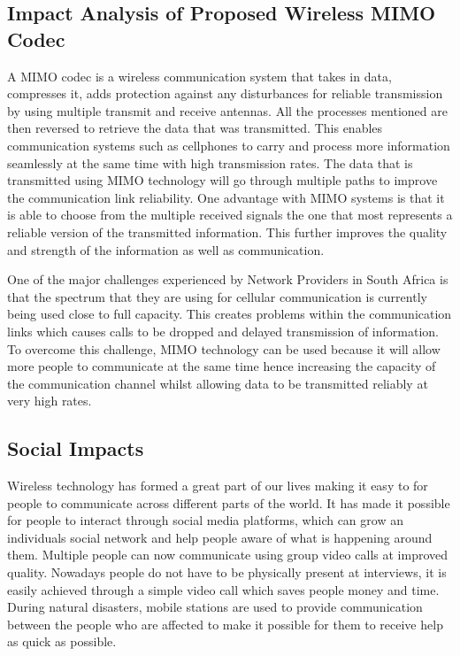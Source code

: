 \documentclass[pdftex,11pt,a4paper]{article}
\begin{document}
\newpage 
\begin{appendices}
	
	\section{Impact Analysis of Proposed Wireless MIMO Codec}
	
	A MIMO codec is a wireless communication system that takes in data, compresses it, adds protection against any disturbances for reliable transmission by using multiple transmit and receive antennas. All the processes mentioned are then reversed to retrieve the data that was transmitted. This enables communication systems such as cellphones to carry and process more information seamlessly at the same time with high transmission rates. The data that is transmitted using MIMO technology will go through multiple paths to improve the communication link reliability. One advantage with MIMO systems is that it is able to choose from the multiple received signals the one that most represents a reliable version of the transmitted information. This further improves the quality and strength of the information as well as communication.
	
	One of the major challenges experienced by Network Providers in South Africa is that the spectrum that they are using for cellular communication is currently being used close to full capacity. This creates problems within the communication links which causes calls to be dropped and delayed transmission of information. To overcome this challenge, MIMO technology can be used because it will allow more people to communicate at the same time hence increasing the capacity of the communication channel whilst allowing data to be transmitted reliably at very high rates.
	
	\subsection{Social Impacts}
	Wireless technology has formed a great part of our lives making it easy to for people to communicate across different parts of the world. It has made it possible for people to interact through social media platforms, which can grow an individuals social network and help people aware of what is happening around them. Multiple people can now communicate using group video calls at improved quality. Nowadays people do not have to be physically present at interviews, it is easily achieved through a simple video call which saves people money and time. During natural disasters, mobile stations are used to provide communication between the people who are affected to make it possible for them to receive help as quick as possible. 
	

\end{appendices}
\end{document}
